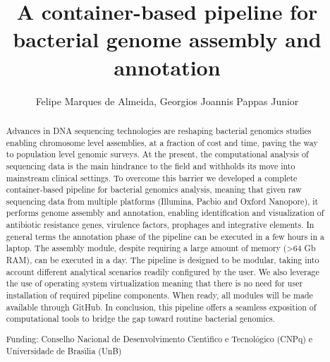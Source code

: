 \documentclass[twoside]{article}
\title{\vspace{-15mm}\fontsize{24pt}{10pt}\selectfont\textbf{ A container-based pipeline for bacterial genome assembly and annotation }} %
\author{ Felipe Marques de Almeida, Georgios Joannis Pappas Junior }
\affil{ Universidade de Bras\'{\i}lia }
\date{}
\begin{document}
  
  
  \maketitle %
  
  
  \thispagestyle{fancy} %
  
  
  \begin{abstract}
  Advances in DNA sequencing technologies are reshaping bacterial genomics studies enabling chromosome level assemblies,  at a fraction of cost and time,  paving the way to population level genomic surveys. At the present,  the computational analysis of sequencing data is the main hindrance to the field and withholds its move into mainstream clinical settings. To overcome this barrier we developed a complete container-based pipeline for bacterial genomics analysis,  meaning that given raw sequencing data from multiple platforms (Illumina,  Pacbio and Oxford Nanopore),  it performs genome assembly and annotation,  enabling identification and visualization of antibiotic resistance genes,  virulence factors,  prophages and integrative elements. In general terms the annotation phase of the pipeline can be executed in a few hours in a laptop. The assembly module,  despite requiring a large amount of memory (>64 Gb RAM),  can be executed in a day. The pipeline is designed to be modular,  taking into account different analytical scenarios readily configured by the user. We also leverage the use of operating system virtualization meaning that there is no need for user installation of required pipeline components. When ready,  all modules will be made available through GitHub. In conclusion,  this pipeline offers a seamless exposition of computational tools to bridge the gap toward routine bacterial genomics.
  
  Funding: Conselho Nacional de Desenvolvimento Cient\'{\i}fico e Tecnol\'ogico (CNPq) e Universidade de Bras\'{\i}lia (UnB) \\ 
  \end{abstract}
  
\end{document}
